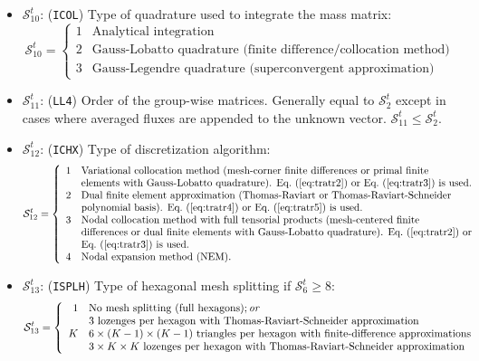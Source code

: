 \begin{itemize}
\item $\mathcal{S}^{t}_{10}$: ({\tt ICOL}) Type of quadrature used to integrate
the mass matrix:
\begin{displaymath}
\mathcal{S}^{t}_{10} = \left\{
\begin{array}{rl}
 1 & \textrm{Analytical integration} \\
 2 & \textrm{Gauss-Lobatto quadrature (finite difference/collocation method)} \\
 3 & \textrm{Gauss-Legendre quadrature (superconvergent approximation)}
\end{array} \right.
\end{displaymath}

\item $\mathcal{S}^{t}_{11}$: ({\tt LL4}) Order of the group-wise matrices.
Generally equal to
$\mathcal{S}^{t}_{2}$ except in cases where averaged fluxes are appended to the
unknown vector. $\mathcal{S}^{t}_{11}\le\mathcal{S}^{t}_{2}$.

\item $\mathcal{S}^{t}_{12}$: ({\tt ICHX}) Type of discretization algorithm:
\begin{displaymath}
\mathcal{S}^{t}_{12} = \left\{
\begin{array}{rl}
 1 & \textrm{Variational collocation method (mesh-corner finite differences or primal finite} \\
   & \textrm{elements with Gauss-Lobatto quadrature). \Eq{tratr2} or \Eq{tratr3} is used.} \\
 2 & \textrm{Dual finite element approximation (Thomas-Raviart or Thomas-Raviart-Schneider} \\
   & \textrm{polynomial basis). \Eq{tratr4} or \Eq{tratr5} is used.} \\
 3 & \textrm{Nodal collocation method with full tensorial products (mesh-centered finite} \\
   & \textrm{differences or dual finite elements with Gauss-Lobatto quadrature). \Eq{tratr2} or} \\
   & \textrm{\Eq{tratr3} is used.} \\
 4 & \textrm{Nodal expansion method (NEM).}
\end{array} \right.
\end{displaymath}

\item $\mathcal{S}^{t}_{13}$: ({\tt ISPLH}) Type of hexagonal mesh splitting if $\mathcal{S}^{t}_{6}\ge 8$:
\begin{displaymath}
\mathcal{S}^{t}_{13} = \left\{
\begin{array}{rl}
 1 & \textrm{No mesh splitting (full hexagons)}; \emph{or} \\
   & \textrm{$3$ lozenges per hexagon with Thomas-Raviart-Schneider approximation} \\
 K & \textrm{$6\times(K-1)\times(K-1)$ triangles per hexagon with finite-difference approximations} \\
   & \textrm{$3\times K \times K$ lozenges per hexagon with Thomas-Raviart-Schneider approximation}
\end{array} \right.
\end{displaymath}


\end{itemize}
